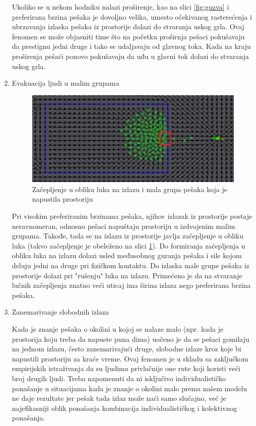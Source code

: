 \documentclass[12pt]{article}
\begin{document}
\begin{enumerate}
Ukoliko se u nekom hodniku nalazi proširenje, kao na slici \ref{fig:guzva} i preferirana brzina pešaka je dovoljno velika, umesto očekivanog rasterećenja i ubrzavanja izlaska pešaka iz prostorije dolazi do stvaranja uskog grla. Ovaj fenomen se može objasniti time što na početku proširnja pešaci pokušavaju da prestignu jedni druge i tako se udaljavaju od glavnog toka. Kada na kraju proširenja pešaći ponovo pokušavaju da uđu u glavni tok dolazi do stvaranja uskog grla.

\item Evakuacija ljudi u malim grupama

\begin{figure}
\centering
\includegraphics{SCGrupa1}
\caption{Začepljenje u obliku luka na izlazu i mala grupa pešaka koja je napustila prostoriju}
\label{fig:grupa}
\end{figure}


Pri visokim preferiranim brzinama pešaka, njihov izlazak iz prostorije postaje neravnomeran, odnosno pešaci napuštaju prostoriju u izdvojenim malim grupama. Takođe, tada se na izlazu iz prostorije javlja začepljenje u obliku luka (takvo začepljenje je obeleženo na slici \ref{fig:grupa}). Do formiranja začepljenja u obliku luka na izlazu dolazi usled međusobnog guranja pešaka i sile kojom deluju jedni na druge pri fizičkom kontaktu. Do izlaska male grupe pešaka iz prostorije dolazi pri "rušenju" luka na izlazu. Primećeno je da na stvaranje lučnih začepljenja znatno veći uticaj ima širina izlaza nego preferirana brzina pešaka.

\item Zanemarivanje slobodnih izlaza

Kada je znanje pešaka o okolini u kojoj se nalaze malo (npr. kada je prostorija koju treba da napuste puna dima) uočeno je da se pešaci gomilaju na jednom izlazu, često zanemarivajući druge, slobodne izlaze kroz koje bi napustili prostoriju za kraće vreme. Ovaj fenomen je u skladu sa zaključkom empirijskih istraživanja da su ljudima privlačnije one rute koji koristi veći broj drugih ljudi. Treba napomenuti da ni isključivo individualističko ponašanje u situacijama kada je znanje o okolini malo prema našem modelu ne daje rezultate jer pešak tada izlaz može naći samo slučajno, već je najefikasniji oblik ponašanja kombinacija individualističkog i kolektivnog ponašanja.


\end{enumerate}
    
\end{document}
